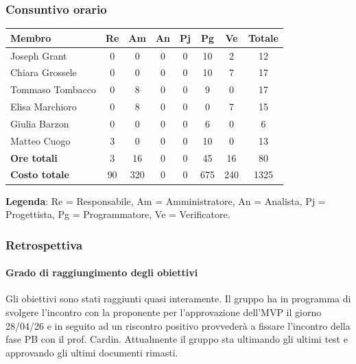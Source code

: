 \documentclass[11pt,a4paper]{article}
\begin{document}
\subsubsection{Consuntivo orario}
\begin{center}
    \begin{tabular}{|l|c|c|c|c|c|c|c|}
        \hline
        \textbf{Membro} & \textbf{Re} & \textbf{Am} & \textbf{An} & \textbf{Pj} & \textbf{Pg} & \textbf{Ve} & \textbf{Totale} \\
        \hline
        Joseph Grant        & 0 & 0 & 0 & 0 & 10 & 2 & 12 \\
        \hline
        Chiara Grossele     & 0 & 0 & 0 & 0 & 10 & 7 & 17 \\
        \hline
        Tommaso Tombacco    & 0 & 8 & 0 & 0 & 9 & 0 & 17 \\
        \hline
        Elisa Marchioro     & 0 & 8 & 0 & 0 & 0 & 7 & 15 \\
        \hline
        Giulia Barzon       & 0 & 0 & 0 & 0 & 6 & 0 & 6 \\
        \hline
        Matteo Cuogo        & 3 & 0 & 0 & 0 & 10 & 0 & 13 \\
        \hline
        \textbf{Ore totali} & 3 & 16 & 0 & 0 & 45 & 16 & 80 \\
        \hline
        \textbf{Costo totale} & 90 & 320 & 0 & 0 & 675 & 240 & 1325 \\
        \hline
    \end{tabular}
\end{center}

\noindent \textbf{Legenda}: Re = Responsabile, Am = Amministratore, An = Analista, Pj = Progettista, Pg = Programmatore, Ve = Verificatore.

\subsubsection{Retrospettiva}
\paragraph{Grado di raggiungimento degli obiettivi}
Gli obiettivi sono stati raggiunti quasi interamente. Il gruppo ha in programma di svolgere l'incontro con la proponente per l'approvazione dell'MVP il giorno 28/04/26 e in seguito ad un riscontro positivo provvederà a fissare l'incontro della fase PB con il prof. Cardin. Attualmente il gruppo sta ultimando gli ultimi test e approvando gli ultimi documenti rimasti. 
\end{document}
